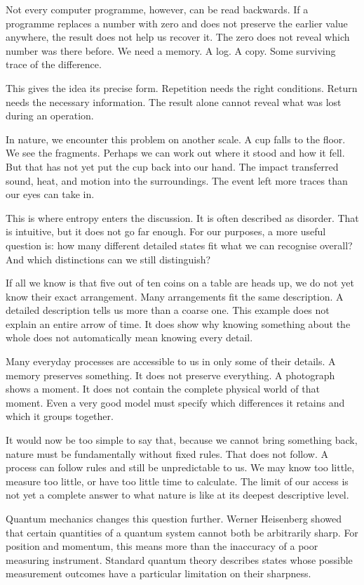 Not every computer programme, however, can be read backwards. If a programme replaces a number with zero and does not preserve the earlier value anywhere, the result does not help us recover it. The zero does not reveal which number was there before. We need a memory. A log. A copy. Some surviving trace of the difference.

This gives the idea its precise form. Repetition needs the right conditions. Return needs the necessary information. The result alone cannot reveal what was lost during an operation.

In nature, we encounter this problem on another scale. A cup falls to the floor. We see the fragments. Perhaps we can work out where it stood and how it fell. But that has not yet put the cup back into our hand. The impact transferred sound, heat, and motion into the surroundings. The event left more traces than our eyes can take in.

This is where entropy enters the discussion. It is often described as disorder. That is intuitive, but it does not go far enough. For our purposes, a more useful question is: how many different detailed states fit what we can recognise overall? And which distinctions can we still distinguish?

If all we know is that five out of ten coins on a table are heads up, we do not yet know their exact arrangement. Many arrangements fit the same description. A detailed description tells us more than a coarse one. This example does not explain an entire arrow of time. It does show why knowing something about the whole does not automatically mean knowing every detail.

Many everyday processes are accessible to us in only some of their details. A memory preserves something. It does not preserve everything. A photograph shows a moment. It does not contain the complete physical world of that moment. Even a very good model must specify which differences it retains and which it groups together.

It would now be too simple to say that, because we cannot bring something back, nature must be fundamentally without fixed rules. That does not follow. A process can follow rules and still be unpredictable to us. We may know too little, measure too little, or have too little time to calculate. The limit of our access is not yet a complete answer to what nature is like at its deepest descriptive level.

Quantum mechanics changes this question further. Werner Heisenberg showed that certain quantities of a quantum system cannot both be arbitrarily sharp. For position and momentum, this means more than the inaccuracy of a poor measuring instrument. Standard quantum theory describes states whose possible measurement outcomes have a particular limitation on their sharpness.

